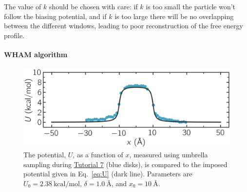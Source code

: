 \documentclass[9pt,tutorial]{livecoms}
\begin{document}
\begin{note}
  The value of $k$ should be chosen with care:
  if $k$ is too small the particle won't follow the biasing potential,
  and if $k$ is too large there will be no overlapping between
  the different windows, leading to poor reconstruction of the free energy profile.
\end{note}

\paragraph{WHAM algorithm}

\begin{figure}
\centering
\includegraphics[width=\linewidth]{US-free-energy}
\caption{The potential, $U$, as a function of $x$, measured using umbrella
sampling during \hyperref[umbrella-sampling-label]{Tutorial 7} (blue disks),
is compared to the imposed potential given in Eq.~\eqref{eq:U}
(dark line).  Parameters are $U_0 = 2.38~\text{kcal/mol}$, $\delta = 1.0~\text{\AA{}}$,
and $x_0 = 10~\text{\AA{}}$.}
\label{fig:US-freenergy}
\end{figure}
\end{document}
